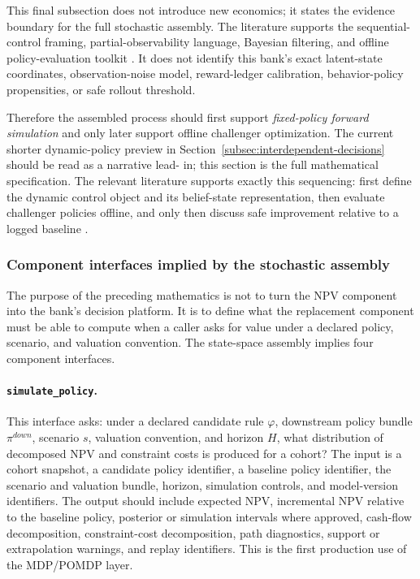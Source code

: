 \documentclass[11pt]{article}
\newcommand{\1}{\mathbf{1}}
\newcommand{\code}[1]{\nolinkurl{#1}}
\begin{document}
This final subsection does not introduce new economics; it states the evidence
boundary for the full stochastic assembly. The literature supports the
sequential-control framing, partial-observability language, Bayesian filtering,
and offline policy-evaluation toolkit
\citep{puterman1994mdp,murphy2003dynamic,smallwood1973pomdp,kaelbling1998pomdp,
trench2003bankone,durbinkoopman2012ssm,westharrison1997bfdm,doucet2001smc,
jiangli2016dr,huwager2021pomdpope,laroche2019spibb,
khraishiokhrati2022offlinecredit,chehrazi2015dynamicvaluation,
chehrazi2019collections}. It does not identify this bank's exact latent-state
coordinates, observation-noise model, reward-ledger calibration,
behavior-policy propensities, or safe rollout threshold.

Therefore the assembled process should first support
\emph{fixed-policy forward simulation} and only later support offline challenger
optimization. The current shorter dynamic-policy preview in
Section~\ref{subsec:interdependent-decisions} should be read as a narrative lead-
in; this section is the full mathematical specification. The relevant literature
supports exactly this sequencing: first define the dynamic control object and
its belief-state representation, then evaluate challenger policies offline, and
only then discuss safe improvement relative to a logged baseline
\citep{puterman1994mdp,murphy2003dynamic,jiangli2016dr,
huwager2021pomdpope,laroche2019spibb,khraishiokhrati2022offlinecredit}.

\subsubsection{Component interfaces implied by the stochastic assembly}
\label{subsec:state-space-component-interfaces}

The purpose of the preceding mathematics is not to turn the NPV component into
the bank's decision platform. It is to define what the replacement component must
be able to compute when a caller asks for value under a declared policy,
scenario, and valuation convention. The state-space assembly implies four
component interfaces.

\paragraph{\code{simulate_policy}.}
This interface asks: under a declared candidate rule $\varphi$, downstream
policy bundle $\pi^{down}$, scenario $s$, valuation convention, and horizon $H$,
what distribution of decomposed NPV and constraint costs is produced for a
cohort? The input is a cohort snapshot, a candidate policy identifier, a baseline
policy identifier, the scenario and valuation bundle, horizon, simulation
controls, and model-version identifiers. The output should include expected NPV,
incremental NPV relative to the baseline policy, posterior or simulation
intervals where approved, cash-flow decomposition, constraint-cost
decomposition, path diagnostics, support or extrapolation warnings, and replay
identifiers. This is the first production use of the MDP/POMDP layer.
\end{document}
